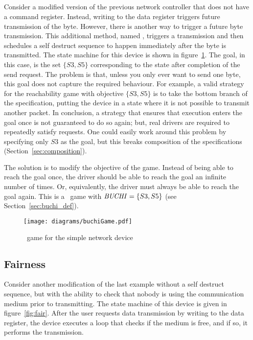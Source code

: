 \subsection{\buchi}

Consider a modified version of the previous network controller that does not have a command register. Instead, writing to the data register triggers future transmission of the byte. However, there is another way to trigger a future byte transmission. This additional method, named , triggers a transmission and then schedules a self destruct sequence to happen immediately after the byte is transmitted. The state machine for this device is shown in figure~\ref{fig:buchi}. The goal, in this case, is the set $\{S3, S5\}$ corresponding to the state after completion of the send request. The problem is that, unless you only ever want to send one byte, this goal does not capture the required behaviour. For example, a valid strategy for the reachability game with objective $\{S3, S5\}$ is to take the bottom branch of the specification, putting the device in a state where it is not possible to transmit another packet. In conclusion, a strategy that ensures that execution enters the goal once is not guaranteed to do so again; but, real drivers are required to repeatedly satisfy requests. One could easily work around this problem by specifying only ${S3}$ as the goal, but this breaks composition of the specifications (Section~\ref{sec:composition}).

The solution is to modify the objective of the game. Instead of being able to reach the goal once, the driver should be able to reach the goal an infinite number of times. Or, equivalently, the driver must always be able to reach the goal again. This is a \buchi\ game with $\mathit{BUCHI} = \{S3, S5\}$ (see Section~\ref{sec:buchi_def}).

\begin{figure}
\centering
\texttt{[image: diagrams/buchiGame.pdf]}
\caption{\buchi\ game for the simple network device}
\label{fig:buchi}
\end{figure}

\subsection{Fairness}
\label{sec:game_fairness}

Consider another modification of the last example without a self destruct sequence, but with the ability to check that nobody is using the communication medium prior to transmitting. The state machine of this device is given in figure~\ref{fig:fair}. After the user requests data transmission by writing to the data register, the device executes a loop that checks if the medium is free, and if so, it performs the transmission. 

